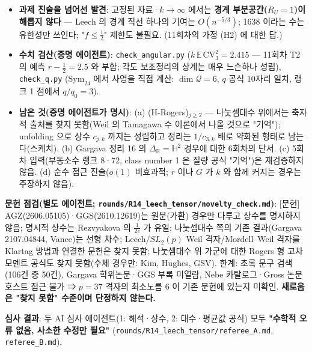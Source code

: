 \begin{itemize}
\item
  \textbf{과제 진술을 넘어선 발견}: 고정된 자료·\(k\to\infty\) 에서는 \textbf{경계 부분공간(\(R_U=1\))이 해롭지 않다} --- Leech 의 경계 직선 하나의 기여는 \(O(n^{-5/3})\); 1638 이라는 수는 유한성만 쓰인다; "\(f\le\frac12\)" 제한도 불필요. (11회차의 가정 (H2) 에 대한 답.)
\item
  \textbf{수치 검산(증명 에이전트)}: \texttt{check\_angular.py} (\(k\,\mathbb E\,\mathrm{CV}_3^2=2.415\) --- 11회차 T2 의 예측 \(r-\frac12=2.5\) 와 부합; 각도 보조정리의 상계는 매우 느슨하나 성립), \texttt{check\_q.py} (\(\mathrm{Sym}_{24}\) 에서 사영을 직접 계산: \(\dim\mathcal Q=6\), \(q\) 공식 10자리 일치, 랭크 1 점에서 \(q/q_0=3\)).
\item
  \textbf{남은 것(증명 에이전트가 명시)}: (a) (H-Rogers)\(_{j\ge2}\) --- 나눗셈대수 위에서는 축자적 출처를 찾지 못함(Weil 의 Tamagawa 수 이론에서 나올 것으로 "기억"); unfolding 으로 상수 \(c_{j,k}\) 까지는 성립하고 정리는 \(1/c_{3,k}\) 배로 약화된 형태로 남는다(스케치). (b) Gargava 정리 16 의 \(\Delta_\mathbb R=\mathbb H^2\) 경우에 대한 6회차의 단서. (c) 5회차 입력(부동소수 랭크 8·72, class number 1 은 질량 공식 "기억")은 재검증하지 않음. (d) 순수 점근 진술(\(o(1)\) 비효과적; \(r\) 이나 \(G\) 가 \(k\) 와 함께 커지는 경우는 주장하지 않음).
\end{itemize}

\textbf{문헌 점검(별도 에이전트; \texttt{rounds/R14\_leech\_tensor/novelty\_check.md})}: {[}문헌{]} AGZ(2606.05105)·GGS(2610.12619)는 원분(가환) 경우만 다루고 상수를 명시하지 않음; 명시적 상수는 Rezvyakova 의 \(\frac1{2e}\) 가 유일; 나눗셈대수 쪽의 기존 결과(Gargava 2107.04844, Vance)는 선형 차수; Leech/\(SL_2(p)\) Weil 격자/Mordell--Weil 격자를 Klartag 방법과 연결한 문헌은 찾지 못함; 나눗셈대수 위 가군에 대한 Rogers 형 고차 모멘트 공식도 찾지 못함(수체 경우만: Kim, Hughes, GSV). 한계: 초록 문구 검색(106건 중 50건), Gargava 학위논문·GGS 부록 미열람, Nebe 카탈로그·Gross 논문 호스트 접근 불가 ⇒ \(p=37\) 격자의 최소노름 6 이 기존 문헌에 있는지 미확인. \textbf{새로움은 "찾지 못함" 수준이며 단정하지 않는다.}

\textbf{심사 결과}: 두 AI 심사 에이전트(1: 해석·상수, 2: 대수·평균값 공식) 모두 \textbf{"수학적 오류 없음, 사소한 수정만 필요"} (\texttt{rounds/R14\_leech\_tensor/referee\_A.md}, \texttt{referee\_B.md}).

